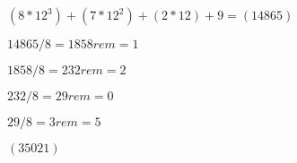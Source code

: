 \documentclass[10pt]{book}
\begin{document}
\begin{mdSnippets}
\newcommand{\jacobi}[2]{\ensuremath{\left(\frac{#1}{#2}\right)}}

\begin{mdInlineSnippet}%
$(8 * 12^3) + (7 * 12^2) + (2 * 12) + 9 = (14865)$\end{mdInlineSnippet}%
\begin{mdInlineSnippet}[022575d1ad2e254a53c223b40dd315f5]%
$14865/8 = 1858 rem = 1$\end{mdInlineSnippet}%
\begin{mdInlineSnippet}[b9929263af8d2f11c0e9b58faca3fe8e]%
$1858/8 = 232 rem = 2$\end{mdInlineSnippet}%
\begin{mdInlineSnippet}[7d994fb1e60d5929236d829cfba8118a]%
$232/8 = 29 rem = 0$\end{mdInlineSnippet}%
\begin{mdInlineSnippet}%
$29/8 = 3 rem = 5$\end{mdInlineSnippet}%
\begin{mdInlineSnippet}%
$(35021)$\end{mdInlineSnippet}%

\end{mdSnippets}
\end{document}
